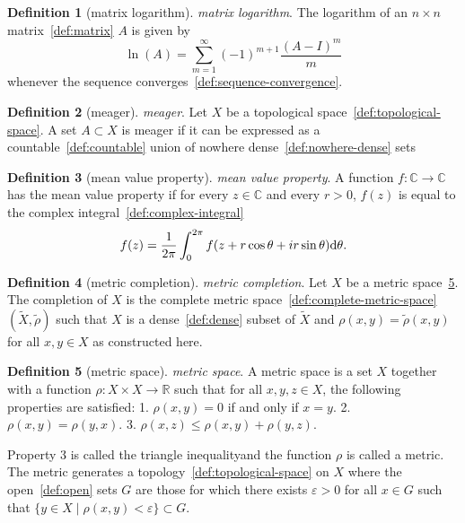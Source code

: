 \documentclass[12pt,a4paper]{article}
\theoremstyle{definition}
\newtheorem{definition}{Definition}
\begin{document}
\begin{definition}[matrix logarithm]\label{def:matrix-logarithm}
\emph{matrix logarithm}. The logarithm of an $n\times n$ matrix~\ref{def:matrix} $A$ is given by $$\ln(A) = \sum_{m=1}^\infty (-1)^{m+1}\frac{(A-I)^m}{m}$$ whenever the sequence converges~\ref{def:sequence-convergence}.
\end{definition}

\begin{definition}[meager]\label{def:meager}
\emph{meager}. Let $X$ be a topological space~\ref{def:topological-space}. A set $A\subset X$ is meager if it can be expressed as a countable~\ref{def:countable} union of nowhere dense~\ref{def:nowhere-dense} sets
\end{definition}

\begin{definition}[mean value property]\label{def:mean-value-property}
\emph{mean value property}. A function $f:\mathbb C\to \mathbb C$ has the mean value property if for every $z\in \mathbb C$ and every $r>0$, $f(z)$ is equal to the complex integral~\ref{def:complex-integral} $$f(z) = \frac{1}{2\pi}\int_0^{2\pi} f(z + r\cos\theta +ir\sin\theta)\text d\theta.$$
\end{definition}

\begin{definition}[metric completion]\label{def:metric-completion}
\emph{metric completion}. Let $X$ be a metric space~\ref{def:metric-space}. The completion of $X$ is the complete metric space~\ref{def:complete-metric-space} $(\tilde X, \tilde \rho)$ such that $X$ is a dense~\ref{def:dense} subset of $\tilde X$ and $\rho(x,y) = \tilde\rho(x,y)$ for all $x,y \in X$ as constructed here.
\end{definition}

\begin{definition}[metric space]\label{def:metric-space}
\emph{metric space}. A metric space is a set $X$ together with a function $\rho: X\times X \to \mathbb R$ such that for all $x,y,z \in X$, the following properties are satisfied:
1. $\rho(x,y) = 0$ if and only if $x=y$.
2. $\rho(x,y) = \rho(y,x)$.
3. $\rho(x,z) \leq \rho(x,y) + \rho(y,z)$. 

Property 3 is called the triangle inequalityand the function $\rho$ is called a metric. The metric generates a topology~\ref{def:topological-space} on $X$ where the open~\ref{def:open} sets $G$ are those for which there exists $\varepsilon > 0$  for all $x \in G$ such that $\{y\in X\mid \rho(x,y) < \varepsilon\}\subset G$.
\end{definition}
\end{document}
